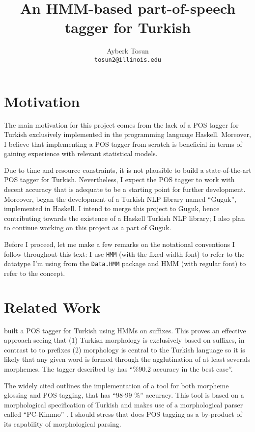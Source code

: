 \documentclass{article}
\title{\bf An HMM-based part-of-speech tagger for Turkish}
\author{Ayberk Tosun\\\texttt{tosun2@illinois.edu}}
\date{}
\begin{document}


\section{Motivation}
\label{sec:motivation}

The main motivation for this project comes from the lack of a POS tagger for
Turkish exclusively implemented in the programming language Haskell. Moreover, I
believe that implementing a POS tagger from scratch is beneficial in terms of
gaining experience with relevant statistical models.

Due to time and resource constraints, it is not plausible to build a
state-of-the-art POS tagger for Turkish. Nevertheless, I expect the POS tagger
to work with decent accuracy that is adequate to be a starting point for further
development. Moreover, \citet{Korkut2015} began the development of a Turkish NLP
library named ``Guguk'', implemented in Haskell. I intend to merge this project
to Guguk, hence contributing towards the existence of a Haskell Turkish NLP
library; I also plan to continue working on this project as a part of Guguk.

Before I proceed, let me make a few remarks on the notational conventions I
follow throughout this text: I use \texttt{HMM} (with the fixed-width font) to
refer to the datatype I'm using from the \texttt{Data.HMM} package and HMM (with
regular font) to refer to the concept.

\section{Related Work}
\label{sec:related_work}

\cite{dincer2008suffix} built a POS tagger for Turkish using HMMs on suffixes.
This proves an effective approach seeing that (1) Turkish morphology is
exclusively based on suffixes, in contrast to to prefixes (2) morphology is
central to the Turkish language so it is likely that any given word is formed
through the agglutination of at least severals morphemes. The tagger described
by \citet{dincer2008suffix} has ``\%90.2 accuracy in the best case''.

The widely cited \citet{oflazer1994tagging} outlines the implementation of a
tool for both morpheme glossing and POS tagging, that has ``98-99 \%'' accuracy.
This tool is based on a morphological specification of Turkish and makes use of
a morphological parser called ``PC-Kimmo'' \citep{antworth1991pc}. I should
stress that \citet{oflazer1994tagging} does POS tagging as a by-product of its
capability of morphological parsing.
\end{document}
